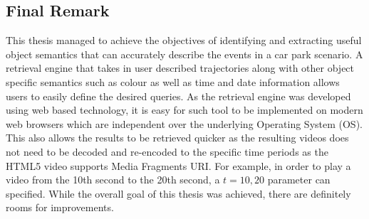 \subsection*{Final Remark}
This thesis managed to achieve the objectives of identifying and extracting useful object semantics that can accurately describe the events in a car park scenario. 
A retrieval engine that takes in user described trajectories along with other object specific semantics such as colour as well as time and date information allows users to easily define the desired queries. 
As the retrieval engine was developed using web based technology, it is easy for such tool to be implemented on modern web browsers which are independent over the underlying Operating System (OS). 
This also allows the results to be retrieved quicker as the resulting videos does not need to be decoded and re-encoded to the specific time periods as the HTML5 video supports Media Fragments URI. 
For example, in order to play a video from the 10th second to the 20th second, a $t=10,20$ parameter can specified.
While the overall goal of this thesis was achieved, there are definitely rooms for improvements.